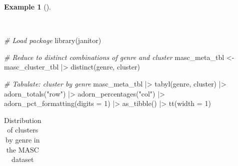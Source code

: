\documentclass[
  letterpaper,
]{book}
\newenvironment{Shaded}{\begin{snugshade}}{\end{snugshade}}
\newcommand{\AttributeTok}[1]{\textcolor[rgb]{0.00,0.00,0.00}{#1}}
\newcommand{\CommentTok}[1]{\textcolor[rgb]{0.00,0.00,0.00}{\textit{#1}}}
\newcommand{\DecValTok}[1]{\textcolor[rgb]{0.00,0.00,0.00}{#1}}
\newcommand{\FunctionTok}[1]{\textcolor[rgb]{0.00,0.00,0.00}{#1}}
\newcommand{\NormalTok}[1]{\textcolor[rgb]{0.00,0.00,0.00}{#1}}
\newcommand{\OtherTok}[1]{\textcolor[rgb]{0.00,0.00,0.00}{#1}}
\newcommand{\SpecialCharTok}[1]{\textcolor[rgb]{0.00,0.00,0.00}{#1}}
\newcommand{\StringTok}[1]{\textcolor[rgb]{0.00,0.00,0.00}{#1}}
\theoremstyle{definition}
\newtheorem{example}{Example}[chapter]
\theoremstyle{remark}
\begin{document}
\begin{example}[]\protect\hypertarget{exm-explore-masc-pos-kmeans-genre}{}\label{exm-explore-masc-pos-kmeans-genre}

~

\begin{Shaded}
\begin{Highlighting}[]
\CommentTok{\# Load package}
\FunctionTok{library}\NormalTok{(janitor)}

\CommentTok{\# Reduce to distinct combinations of genre and cluster}
\NormalTok{masc\_meta\_tbl }\OtherTok{\textless{}{-}}
\NormalTok{  masc\_cluster\_tbl }\SpecialCharTok{|\textgreater{}}
  \FunctionTok{distinct}\NormalTok{(genre, cluster)}

\CommentTok{\# Tabulate: cluster by genre}
\NormalTok{masc\_meta\_tbl }\SpecialCharTok{|\textgreater{}}
  \FunctionTok{tabyl}\NormalTok{(genre, cluster) }\SpecialCharTok{|\textgreater{}}
  \FunctionTok{adorn\_totals}\NormalTok{(}\StringTok{"row"}\NormalTok{) }\SpecialCharTok{|\textgreater{}}
  \FunctionTok{adorn\_percentages}\NormalTok{(}\StringTok{"col"}\NormalTok{) }\SpecialCharTok{|\textgreater{}}
  \FunctionTok{adorn\_pct\_formatting}\NormalTok{(}\AttributeTok{digits =} \DecValTok{1}\NormalTok{) }\SpecialCharTok{|\textgreater{}}
  \FunctionTok{as\_tibble}\NormalTok{() }\SpecialCharTok{|\textgreater{}}
  \FunctionTok{tt}\NormalTok{(}\AttributeTok{width =} \DecValTok{1}\NormalTok{)}
\end{Highlighting}
\end{Shaded}

\begin{longtable}[]{@{}
  >{\raggedright\arraybackslash}p{}
  >{\raggedright\arraybackslash}p{}
  >{\raggedright\arraybackslash}p{}
  >{\raggedright\arraybackslash}p{}
  >{\raggedright\arraybackslash}p{}@{}}

\caption{\label{tbl-explore-masc-pos-kmeans-genre}Distribution of
clusters by genre in the MASC dataset}

\tabularnewline


\end{longtable}
\end{example}
\end{document}
